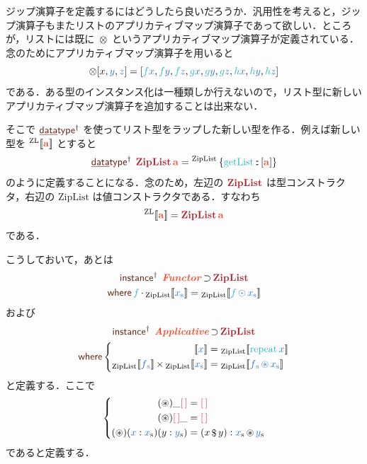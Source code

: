 \documentclass[a5paper,twoside,fleqn,draft]{jsbook}
\def\[{[\![}
\def\]{]\!]}
\def\constantColor{WildStrawberry}
\def\keywordColor{Sepia}
\def\varColor{NavyBlue}
\def\funcColor{BlueGreen}
\def\typeColor{RedOrange}
\def\typeConstColor{Maroon}
\newcommand{\mKeyword}[1]{\textcolor{\keywordColor}{\mathsf{#1}}}
\newcommand{\mKeywordUnderline}[1]{\textcolor{\keywordColor}{\text{\underline{\textsf{#1}}}}}
\newcommand{\mDataTypeKeyword}{\mKeywordUnderline{data}\mKeyword{type}}
\newcommand{\mInstanceDeclKeyword}{\mKeyword{instance}}
\newcommand{\mWhereKeyword}{\mKeyword{where}}
\newcommand{\mPolymorphic}[1]{{#1}^\dagger}
\newcommand{\mSpecialTypeConstructor}[1]{\textcolor{\typeConstColor}{\textbf{#1}}}
\DeclareMathOperator{\mDataTypePolymorphic}{\mDataTypeKeyword^\dagger}
\DeclareMathOperator{\mInstanceDeclPolymorphic}{\mPolymorphic{\mInstanceDeclKeyword}}
\DeclareMathOperator{\mSuperSet}{\supset}
\DeclareMathOperator{\mWhere}{\mWhereKeyword}
\newcommand{\mEmptyList}{{\textcolor{\constantColor}{[\,]}}}
\newcommand{\mVar}[1]{\textcolor{\varColor}{#1}}
\newcommand{\mXVar}{\mVar{x}}
\newcommand{\mYVar}{\mVar{y}}
\newcommand{\mZVar}{\mVar{z}}
\newcommand{\mFunc}[1]{\textcolor{\funcColor}{#1}}
\newcommand{\mSpecialFunc}[1]{\textcolor{\funcColor}{\textrm{#1}}}
\newcommand{\mFFunc}{{\mFunc{f}}}
\newcommand{\mGFunc}{\mFunc{g}}
\newcommand{\mHFunc}{\mFunc{h}}
\DeclareMathOperator{\mGetList}{\mSpecialFunc{getList}}
\DeclareMathOperator{\mRepeat}{\mSpecialFunc{repeat}}
\DeclareMathOperator{\mApply}{\$}
\DeclareMathOperator{\mAppMap}{\times}
\DeclareMathOperator{\mAppMapList}{\otimes}
\DeclareMathOperator{\mIn}{{:\!:}}
\DeclareMathOperator{\mMap}{\cdot}
\DeclareMathOperator{\mMapList}{\odot}
\DeclareMathOperator{\mZip}{\circledast}
\newcommand{\mType}[1]{\textcolor{\typeColor}{\mathbf{#1}}}
\newcommand{\mA}{\mType{a}}
\newcommand{\mTypeAssemble}[2]{{}^\mathrm{#1}\[\mType{#2}\]}
\newcommand{\mZipListType}[1]{\mTypeAssemble{ZL}{#1}}
\DeclareMathOperator{\mZipListTypeConstructor}{\mSpecialTypeConstructor{ZipList}}
\newcommand{\mValueConstructor}[1]{\mathrm{#1}}
\newcommand{\mValueWith}[2]{{}_\mValueConstructor{#1}\[\mVar{#2}\]}
\newcommand{\mValueRecordBeginWith}[1]{{}^\mValueConstructor{#1}\,\{}
\newcommand{\mValueRecordEnd}{\}}
\newcommand{\mValueRecordWith}[2]{\mValueRecordBeginWith{#1}{#2}\mValueRecordEnd}
\newcommand{\mZipListWith}[1]{\mValueWith{ZipList}{#1}}
\newcommand{\mPureWith}[1]{\[\mVar{#1}\]}
\newcommand{\mTypeClass}[1]{\textcolor{\typeColor}{\textbf{\textit{#1}}}}
\newcommand{\mApplicativeTypeClass}{\mTypeClass{Applicative}}
\newcommand{\mFunctorTypeClass}{\mTypeClass{Functor}}
\newcommand{\mList}[1]{\mVar{#1}_\mathrm{s}}
\begin{document}
ジップ演算子を定義するにはどうしたら良いだろうか．汎用性を考えると，ジップ演算子もまたリストのアプリカティブマップ演算子であって欲しい．ところが，リストには既に $\mAppMapList$ というアプリカティブマップ演算子が定義されている．念のためにアプリカティブマップ演算子を用いると
\begin{equation}
  [\mFFunc,\mGFunc,\mHFunc]\mAppMapList[x,\mYVar,\mZVar]
  =[\mFFunc\mXVar,\mFFunc\mYVar,\mFFunc\mZVar,\mGFunc\mXVar,\mGFunc\mYVar,\mGFunc\mZVar,\mHFunc\mXVar,\mHFunc\mYVar,\mHFunc\mZVar]
\end{equation}
である．ある型のインスタンス化は一種類しか行えないので，リスト型に新しいアプリカティブマップ演算子を追加することは出来ない．

そこで $\mDataTypePolymorphic$ を使ってリスト型をラップした新しい型を作る．例えば新しい型を $\mZipListType{a}$ とすると
\begin{equation}
  \label{eq:data-type-ziplist}
  \mDataTypePolymorphic\;
  \mathop{\mZipListTypeConstructor}\mA
  =\mValueRecordWith{ZipList}{\mGetList\mIn{}[\mA]}
\end{equation}
のように定義することになる．念のため，左辺の $\mZipListTypeConstructor$ は型コンストラクタ，右辺の $\mValueConstructor{ZipList}$ は値コンストラクタである．すなわち
\begin{equation}
  \mZipListType{a}
  =\mZipListTypeConstructor\mA
\end{equation}
である．

こうしておいて，あとは
\begin{multline}
  \mInstanceDeclPolymorphic\;
  \mFunctorTypeClass\mSuperSet\mZipListTypeConstructor\\
  \mWhere
  \mFFunc\mMap{}\mZipListWith{\mList{x}}=\mZipListWith{\mFFunc\mMapList\mList{x}}
\end{multline}
および
\begin{multline}
  \mInstanceDeclPolymorphic\;
  \mApplicativeTypeClass\mSuperSet\mZipListTypeConstructor\\
  \mWhere
  \left\{
  \begin{aligned}
    \mPureWith{x}
    &=\mZipListWith{\mRepeat x}\\
    \mZipListWith{\mList{f}}\mAppMap\mZipListWith{\mList{x}}
    &=\mZipListWith{\mList{f}\mZip\mList{x}}
  \end{aligned}
  \right.
\end{multline}
と定義する．ここで
\begin{equation}
  \label{eq:zip}
  \left\{
  \begin{aligned}
    (\mZip)\_\mEmptyList&=\mEmptyList\\
    (\mZip)\mEmptyList\_&=\mEmptyList\\
    (\mZip)(\mXVar:\mList{x})(y:\mList{y})&=(x\mApply y):\mList{x}\mZip\mList{y}
  \end{aligned}
  \right.
\end{equation}
であると定義する．
\end{document}
